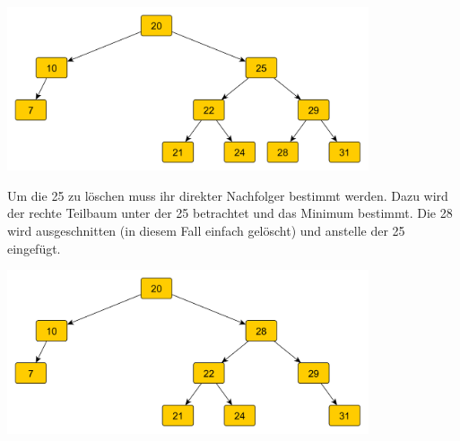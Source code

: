 \begin{center}
\includegraphics[width=0.8\textwidth]{Teilaufgaben/512-Baume/2durchgang-27loschen.png}
\end{center}

Um die 25 zu löschen muss ihr direkter Nachfolger bestimmt werden. Dazu wird der rechte Teilbaum unter der 25 betrachtet und das Minimum bestimmt. Die 28 wird ausgeschnitten (in diesem Fall einfach gelöscht) und anstelle der 25 eingefügt.

\begin{center}
\includegraphics[width=0.8\textwidth]{Teilaufgaben/512-Baume/3durchgang-25loschen.png}
\end{center}
